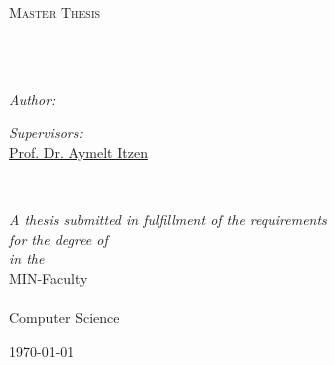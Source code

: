\documentclass[
11pt, %
english, %
singlespacing, %
headsepline, %
]{MasterThesis} %
\author{Michael \textsc{Hüppe}, 7785252} %
\newcommand{\aymeltItzen}{\href{https://www.uke.de/allgemein/arztprofile-und-wissenschaftlerprofile/wissenschaftlerprofilseite_aymelt_itzen.html}{ Prof. Dr. Aymelt Itzen }}
\begin{document}
\frontmatter %

\pagestyle{plain} %


\begin{titlepage}
\begin{center}

\vspace*{.06\textheight}
{\scshape\LARGE \univname\par}\vspace{1.5cm} %
\textsc{\Large Master Thesis}\\[0.5cm] %

\HRule \\[0.4cm] %
{\huge \bfseries \ttitle\par}\vspace{0.4cm} %
\HRule \\[1.5cm] %
 
\begin{minipage}[t]{0.4\textwidth}
\begin{flushleft} \large
\emph{Author:}\\
\href{https://www.linkedin.com/in/michael-h\%C3\%BCppe-1053b61a1/?originalSubdomain=de}{\authorname} %
\end{flushleft}
\end{minipage}
\begin{minipage}[t]{0.4\textwidth}
\begin{flushright} \large
\emph{Supervisors:} \\
\href{https://www.zbh.uni-hamburg.de/personen/mlbi/fkern.html}{\supname} %
\newline
\aymeltItzen
\end{flushright}
\end{minipage}\\[3cm]
 
\vfill

\large \textit{A thesis submitted in fulfillment of the requirements\\ for the degree of \degreename}\\[0.3cm] %
\textit{in the}\\[0.4cm]
MIN-Faculty \\\deptname\\ Computer Science \\ [2cm] %
 
\vfill

{\large \today}\\[4cm] %
 
\vfill
\end{center}
\end{titlepage}
\end{document}
